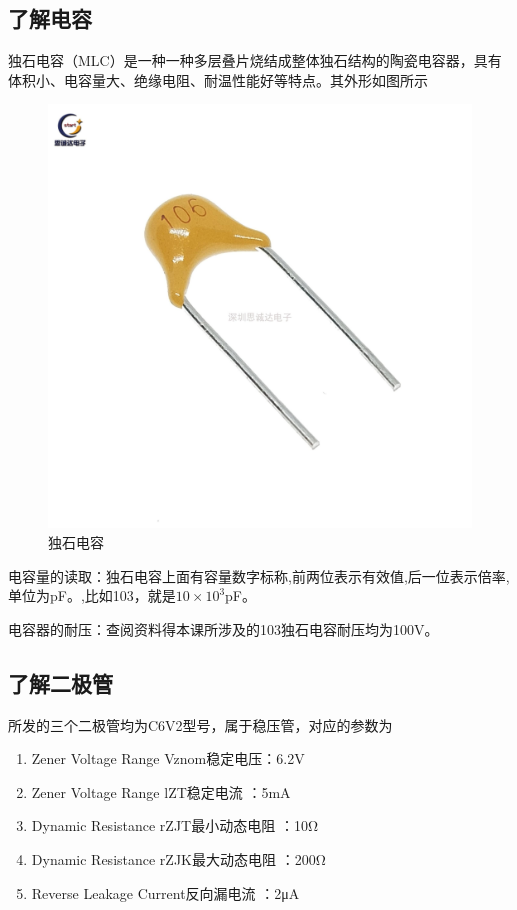 \documentclass{ctexart}
\begin{document}
\subsection{了解电容}
独石电容（MLC）是一种一种多层叠片烧结成整体独石结构的陶瓷电容器，具有体积小、电容量大、绝缘电阻、耐温性能好等特点。其外形如图所示
\begin{figure}[!ht]\label{独石电容}
    \centering 
    \includegraphics[scale=0.06]{./pictures/独石电容.jpeg}
    \caption{独石电容}  
\end{figure}
电容量的读取：独石电容上面有容量数字标称,前两位表示有效值,后一位表示倍率,单位为pF。,比如103，就是$10\times 10^3$pF。

电容器的耐压：查阅资料得本课所涉及的103独石电容耐压均为100V。
\subsection{了解二极管}
所发的三个二极管均为C6V2型号，属于稳压管，对应的参数为
\begin{enumerate}
    \item Zener Voltage Range Vznom稳定电压：6.2V
    \item Zener Voltage Range lZT稳定电流 ：5mA
    
    \item Dynamic Resistance rZJT最小动态电阻 ：10Ω
    
    \item Dynamic Resistance rZJK最大动态电阻 ：200Ω
    
    \item Reverse Leakage Current反向漏电流 ：2μA
\end{enumerate}
\end{document}
